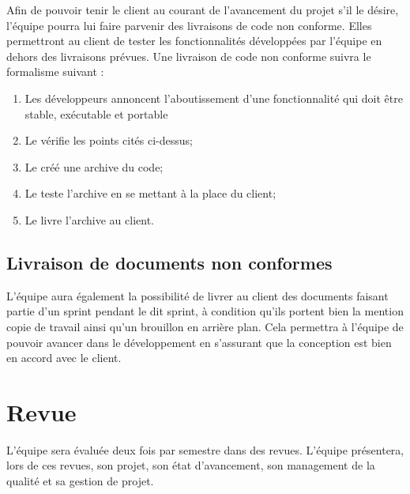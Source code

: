 Afin de pouvoir tenir le client au courant de l’avancement du projet s’il le désire, l’équipe \nomEquipe{} pourra lui faire parvenir des livraisons de code non conforme. Elles permettront au client de tester les fonctionnalités développées par l’équipe en dehors des livraisons prévues. Une livraison de code non conforme suivra le formalisme suivant :
\begin{enumerate}
\item Les développeurs annoncent l’aboutissement d’une fonctionnalité qui doit être stable, exécutable et portable 
\item Le \RD{} vérifie les points cités ci-dessus;
\item Le \RD{} créé une archive du code;
\item Le \CP{} teste l’archive en se mettant à la place du client;
\item Le \CP{} livre l’archive au client.

\end{enumerate}

\subsection{Livraison de documents non conformes}

L’équipe \nomEquipe{} aura également la possibilité de livrer au client des documents faisant partie d’un sprint pendant le dit sprint, à condition qu’ils portent bien la mention copie de travail ainsi qu’un \og brouillon \fg{} en arrière plan. Cela permettra à l’équipe de pouvoir avancer dans le développement en s’assurant que la conception est bien en accord avec le client.

\section{Revue}
\label{revue}

L’équipe \PICCourt sera évaluée deux fois par semestre dans des revues. L’équipe présentera, lors de ces revues, son projet, son état d’avancement, son management de la qualité et sa gestion de projet.



